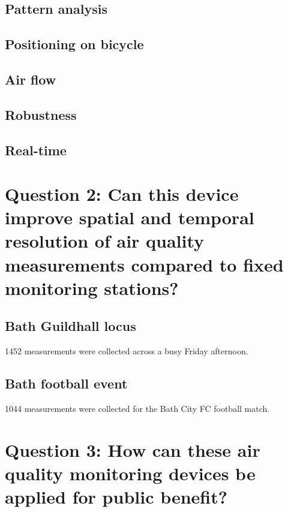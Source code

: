 \documentclass[11pt]{report}
\begin{document}
\subsection{Pattern analysis}

\subsection{Positioning on bicycle}

\subsection{Air flow}

\subsection{Robustness}

\subsection{Real-time}


\section{Question 2: Can this device improve spatial and temporal resolution of air quality measurements compared to fixed monitoring stations?} \label{q2_results}

\subsection{Bath Guildhall locus}

\num{1452} measurements were collected across a busy Friday afternoon.

\subsection{Bath football event}

\num{1044} measurements were collected for the Bath City FC football match.


\section{Question 3: How can these air quality monitoring devices be applied for public benefit?} \label{q3_results}
\end{document}
